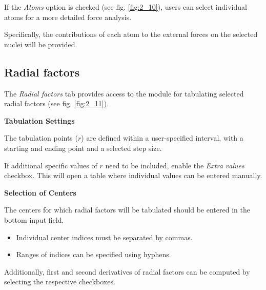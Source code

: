 \documentclass[10pt]{article}
\begin{document}
If the {\it Atoms} option is checked (see fig. \ref{fig:2_10}),
users can select individual atoms for a more detailed force analysis.

Specifically, the contributions of each atom
to the external forces on the selected nuclei will be provided.


\subsection{Radial factors \label{sec:2.11}}

The {\it Radial factors} tab provides access to the module
for tabulating selected radial factors (see fig. \ref{fig:2_11}).

\vspace*{3mm}
{\bf Tabulation Settings}
\vspace*{3mm}

The tabulation points ($r$) are defined within a user-specified interval,
with a starting and ending point and a selected step size.

If additional specific values of $r$ need to be included,
enable the {\it Extra values} checkbox.
This will open a table where individual values can be entered manually.

\vspace*{3mm}
{\bf Selection of Centers}
\vspace*{3mm}

The centers for which radial factors will be tabulated
should be entered in the bottom input field.

\begin{itemize}
\item Individual center indices must be separated by commas.
\item Ranges of indices can be specified using hyphens.
\end{itemize}

Additionally, first and second derivatives of radial factors
can be computed by selecting the respective checkboxes.
\end{document}
